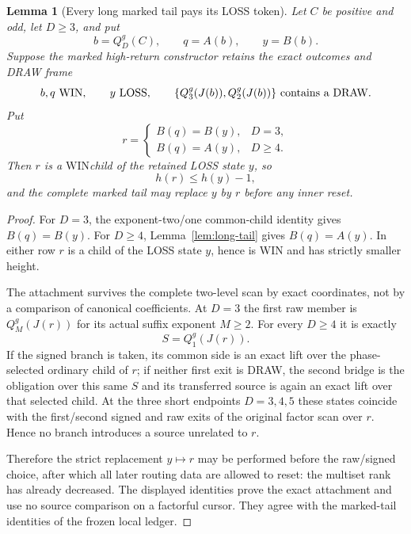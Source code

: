 \documentclass[11pt]{article}
\newtheorem{lemma}[theorem]{Lemma}
\newcommand{\WIN}{\ensuremath{\mathrm{WIN}}}
\newcommand{\LOSS}{\ensuremath{\mathrm{LOSS}}}
\newcommand{\DRAW}{\ensuremath{\mathrm{DRAW}}}
\begin{document}
\begin{lemma}[Every long marked tail pays its LOSS token]
\label{lem:marked-tail-pay}
Let $C$ be positive and odd, let $D\ge3$, and put
\[
 b=Q_D^g(C),\qquad q=A(b),\qquad y=B(b).
\]
Suppose the marked high-return constructor retains the exact outcomes and
DRAW frame
\[
 b,q\text{ \WIN},\qquad y\text{ \LOSS},\qquad
 \{Q_3^g(J(b)),Q_2^g(J(b))\}\text{ contains a \DRAW}.
\]
Put
\[
 r=\begin{cases}
    B(q)=B(y),&D=3,\\
    B(q)=A(y),&D\ge4.
   \end{cases}
\]
Then $r$ is a \WIN child of the retained LOSS state $y$, so
\[
 h(r)\le h(y)-1,
\]
and the complete marked tail may replace $y$ by $r$ before any inner reset.
\end{lemma}

\begin{proof}
For $D=3$, the exponent-two/one common-child identity gives
$B(q)=B(y)$.  For $D\ge4$, Lemma~\ref{lem:long-tail} gives
$B(q)=A(y)$.  In either row $r$ is a child of the LOSS state $y$, hence is
WIN and has strictly smaller height.

The attachment survives the complete two-level scan by exact coordinates,
not by a comparison of canonical coefficients.  At $D=3$ the first raw
member is $Q_M^g(J(r))$ for its actual suffix exponent $M\ge2$.  For every
$D\ge4$ it is exactly
\[
 S=Q_1^g(J(r)).
\]
If the signed branch is taken, its common side is an exact lift over the
phase-selected ordinary child of $r$; if neither first exit is DRAW, the
second bridge is the obligation over this same $S$ and its transferred
source is again an exact lift over that selected child.  At the three short
endpoints $D=3,4,5$ these states coincide with the first/second signed and
raw exits of the original factor scan over $r$.  Hence no branch introduces
a source unrelated to $r$.

Therefore the strict replacement $y\mapsto r$ may be performed before the
raw/signed choice, after which all later routing data are allowed to reset:
the multiset rank has already decreased.  The displayed identities prove the exact attachment and use no source
comparison on a factorful cursor.  They agree with the marked-tail identities
of the frozen local ledger.
\end{proof}
\end{document}
